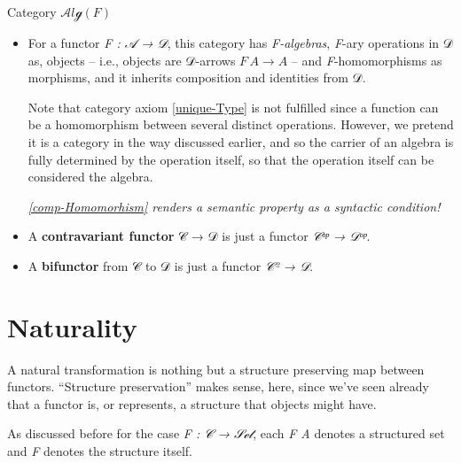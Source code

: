 \documentclass[11pt]{article}
\begin{document}
Category \(𝒜lℊ(F)\)
\begin{itemize}
\item For a functor \emph{F : 𝒜 → 𝒟}, this category has \emph{F-algebras}, \emph{F}-ary operations in 𝒟 as, objects
-- i.e., objects are 𝒟-arrows \(F\, A → A\) --
and \emph{F}-homomorphisms as morphisms, and it inherits composition and identities from 𝒟.

{\setlength{\abovedisplayskip}{-1pt}\setlength{\belowdisplayskip}{-1pt}



}

Note that category axiom \eqref{unique-Type} is not fulfilled since a function can be
a homomorphism between several distinct operations. However, we pretend it is a category
in the way discussed earlier, and so the carrier of an algebra is fully determined by
the operation itself, so that the operation itself can be considered the algebra.

\begin{center}
\emph{\ref{comp-Homomorhism} renders a semantic property as a syntactic condition!}
\end{center}
\end{itemize}

\vspace{1em}

\begin{itemize}
\item A \textbf{contravariant functor} 𝒞 → 𝒟 is just a functor \emph{𝒞ᵒᵖ → 𝒟ᵒᵖ}.
\item A \textbf{bifunctor} from 𝒞 to 𝒟 is just a functor \emph{𝒞² → 𝒟}.
\end{itemize}

\section{Naturality}
\label{sec:org094672d}

A natural transformation is nothing but a structure preserving map between functors.
“Structure preservation” makes sense, here, since we've seen already that a functor
is, or represents, a structure that objects might have.

\room

As discussed before for the case \emph{F : 𝒞 → 𝒮ℯ𝓉}, each \emph{F A} denotes a structured set
and \emph{F} denotes the structure itself.
\end{document}
